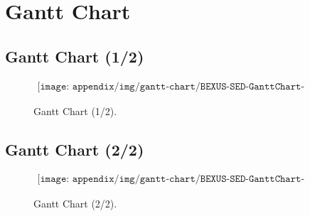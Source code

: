 \section{Gantt Chart} \label{sec:appF}
\subsection{Gantt Chart (1/2)}
\begin{figure}[H]
    \begin{align*}
        \texttt{[image: appendix/img/gantt-chart/BEXUS-SED-GanttChart-Complete-1.png]}
    \end{align*}
    \caption{Gantt Chart (1/2).}
    \label{fig:gantt-chart-1}
\end{figure}

\subsection{Gantt Chart (2/2)}

\begin{figure}[H]
    \begin{align*}
        \texttt{[image: appendix/img/gantt-chart/BEXUS-SED-GanttChart-Complete-2.png]}
    \end{align*}
    \caption{Gantt Chart (2/2).}
    \label{fig:gantt-chart-2}
\end{figure}
